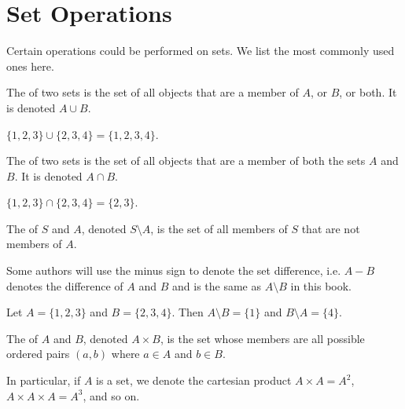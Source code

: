 \newpage

\section{Set Operations}
Certain operations could be performed on sets. We list the most commonly used ones here.
\begin{definition}
    The  of two sets is the set of all objects that are a member of $A$, or $B$, or both. It is denoted $A \cup B$.
\end{definition}

\begin{example}
    $\{1, 2, 3\} \cup \{2, 3, 4\} = \{1, 2, 3, 4\}$.
\end{example}

\begin{definition}
    The  of two sets is the set of all objects that are a member of both the sets $A$ and $B$. It is denoted $A \cap B$.
\end{definition}

\begin{example}
    $\{1, 2, 3\} \cap \{2, 3, 4\} = \{2, 3\}$.
\end{example}

\begin{definition}
    The  of $S$ and $A$, denoted $S \setminus A$, is the set of all members of $S$ that are not members of $A$.
\end{definition}
\begin{remark}
    Some authors will use the minus sign to denote the set difference, i.e. $A - B$ denotes the difference of $A$ and $B$ and is the same as $A \setminus B$ in this book.
\end{remark}

\begin{example}
    Let $A = \{1, 2, 3\}$ and $B = \{2, 3, 4\}$. Then $A \setminus B = \{1\}$ and $B \setminus A = \{4\}$.
\end{example}

\begin{definition}
    The  of $A$ and $B$, denoted $A \times B$, is the set whose members are all possible ordered pairs $(a, b)$ where $a \in A$ and $b \in B$.
\end{definition}
\begin{remark}
    In particular, if $A$ is a set, we denote the cartesian product $A \times A = A^2$, $A\times A \times A = A^3$, and so on.
\end{remark}

